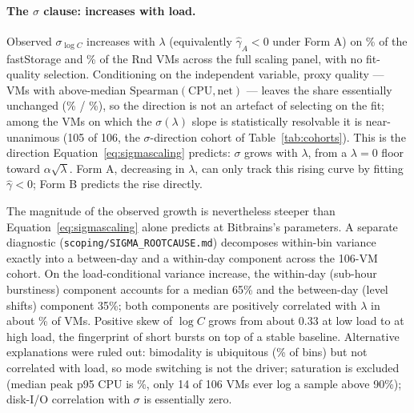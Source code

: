 \documentclass[11pt,a4paper]{article}
\begin{document}
\paragraph{The $\sigma$ clause: increases with load.} Observed
$\sigma_{\log C}$ increases with $\lambda$ (equivalently
$\hat\gamma_A < 0$ under Form A) on \SigDirFsFull\% of the
\SigDirFsFullN{} fastStorage and \SigDirRnFull\% of the \SigDirRnFullN{}
Rnd VMs across the full scaling panel, with no fit-quality selection.
Conditioning on the independent variable, proxy quality --- VMs with
above-median $\text{Spearman}(\text{CPU},\text{net})$ --- leaves the
share essentially unchanged (\SigDirFsProx\% / \SigDirRnProx\%), so the
direction is not an artefact of selecting on the fit; among the VMs on
which the $\sigma(\lambda)$ slope is statistically resolvable it is
near-unanimous (105 of 106, the $\sigma$-direction cohort of
Table~\ref{tab:cohorts}). This is the direction
Equation~\eqref{eq:sigmascaling} predicts: $\sigma$ grows with
$\lambda$, from a $\lambda=0$ floor toward $\alpha\sqrt{\lambda}$.
Form A, decreasing in $\lambda$, can only track this rising curve by
fitting $\hat\gamma < 0$; Form B predicts the rise directly.

The magnitude of the observed growth is nevertheless steeper than
Equation~\eqref{eq:sigmascaling} alone predicts at Bitbrains's parameters.
A separate diagnostic (\texttt{scoping/SIGMA\_ROOTCAUSE.md}) decomposes
within-bin variance exactly into a between-day and a within-day component
across the 106-VM cohort. On the load-conditional variance increase, the
within-day (sub-hour burstiness) component accounts for a median 65\% and
the between-day (level shifts) component 35\%; both components are positively
correlated with $\lambda$ in about \DiagCompRise\% of VMs. Positive skew of $\log C$
grows from about 0.33 at low load to \DiagSkewHi{} at high load, the fingerprint of
short bursts on top of a stable baseline. Alternative explanations were
ruled out: bimodality is ubiquitous (\DiagBimodal\% of bins) but not correlated with
load, so mode switching is not the driver; saturation is excluded (median
peak p95 CPU is \DiagMaxPNine\%, only 14 of 106 VMs ever log a sample above 90\%);
disk-I/O correlation with $\sigma$ is essentially zero.
\end{document}
